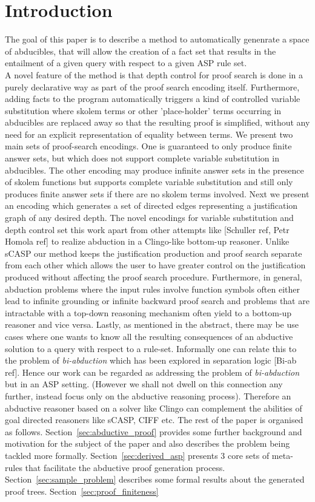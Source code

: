 \documentclass{article}
\begin{document}
\section{Introduction}
The goal of this paper is to describe a method to automatically genenrate a space of abducibles, that will allow the creation of a fact set that results in the entailment of a given query with respect to a given ASP rule set. \\
\newline
A novel feature of the method is that depth control for proof search is done in a purely declarative way as part of the proof search encoding itself. Furthermore, adding facts to the program automatically triggers a kind of controlled variable substitution where skolem terms or other 'place-holder' terms occurring in abducibles are replaced away so that the resulting proof is simplified, without any need for an explicit representation of equality between terms. We present two main sets of proof-search encodings. One is guaranteed to only produce finite answer sets, but which does not support complete variable substitution in abducibles. The other encoding may produce infinite answer sets in the presence of skolem functions but supports complete variable substitution and still only produces finite answer sets if there are no skolem terms involved. Next we present an encoding which generates a set of directed edges representing a justification graph of any desired depth. The novel encodings for variable substitution and depth control set this work apart from other attempts like [Schuller ref, Petr Homola ref] to realize abduction in a Clingo-like bottom-up reasoner. Unlike sCASP our method keeps the justification production and proof search separate from each other which allows the user to have greater control on the justification produced without affecting the proof search procedure. Furthermore, in general, abduction problems where the input rules involve function symbols often either lead to infinite grounding or infinite backward proof search and problems that are intractable with a top-down reasoning mechanism often yield to a bottom-up reasoner and vice versa. Lastly, as mentioned in the abstract, there may be use cases where one wants to know all the resulting consequences of an abductive solution to a query with respect to a rule-set. Informally one can relate this to the problem of \emph{bi-abduction} which has been explored in separation logic [Bi-ab ref]. Hence our work can be regarded as addressing the problem of \emph{bi-abduction} but in an ASP setting. (However we shall not dwell on this connection any further, instead focus only on the abductive reasoning process). Therefore an abductive reasoner based on a solver like Clingo can complement the abilities of goal directed reasoners like sCASP, CIFF etc.  The rest of the paper is organised as follows. Section~\ref{sec:abductive_proof} provides some further background and motivation for the subject of the paper and also describes the problem being tackled more formally. Section~\ref{sec:derived_asp} presents 3 core sets of meta-rules that facilitate the abductive proof generation process. Section~\ref{sec:sample_problem} describes some formal results about the generated proof trees. Section~\ref{sec:proof_finiteness} 
\end{document}
